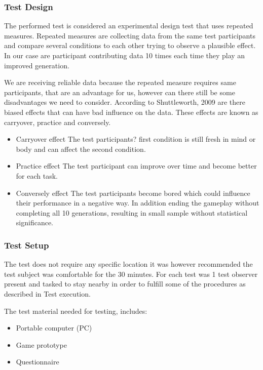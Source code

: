 \subsubsection{Test Design}  
The performed test is considered an experimental design test that uses repeated measures. 
Repeated measures are collecting data from the same test participants and compare several conditions to each other trying to observe a plausible effect. \cite{Shuttleworth2009} In our case are participant contributing data 10 times each time they play an improved generation. 

We are receiving reliable data because the repeated measure requires same participants, that are an advantage for us, however can there still be some disadvantages we need to consider. According to Shuttleworth, 2009 are there biased effects that can have bad influence on the data. These effects are known as carryover, practice and conversely. \cite{Shuttleworth2009}   

\begin{itemize}
\item Carryover effect 
The test participants? first condition is still fresh in mind or body and can affect the second condition. 

\item Practice effect
The test participant can improve over time and become better for each task. 
	
\item Conversely effect 
The test participants become bored which could influence their performance in a negative way. In addition ending the gameplay without completing all 10 generations, resulting in small sample without statistical significance. 

 \end{itemize}


\subsubsection{Test Setup} 
The test does not require any specific location it was however recommended the test subject was comfortable for the 30 minutes. For each test was 1 test observer present and tasked to stay nearby in order to fulfill some of the procedures as described in Test execution. 

The test material needed for testing, includes:
\begin{itemize}
\item	Portable computer (PC) 
\item	Game prototype
\item	Questionnaire 
 \end{itemize}
  
